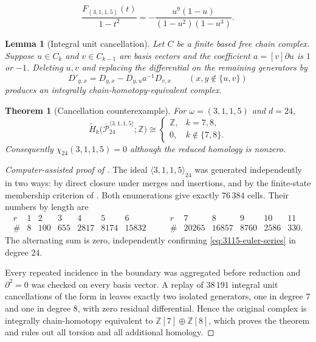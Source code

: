 \documentclass[10pt,a4paper]{amsart}
\newtheorem{theorem}{Theorem}
\newtheorem{lemma}{Lemma}
\newcommand{\Pw}{\overline{\mathcal P}}
\newcommand{\ZZ}{\mathbb Z}
\begin{document}
\begin{equation}\label{eq:3115-euler-series}
 \frac{F_{(3,1,1,5)}(t)}{1-t^2}
 =-\frac{u^9(1-u)}{(1-u^2)(1-u^3)}.
\end{equation}

\begin{lemma}[Integral unit cancellation]\label{lem:unit-cancellation}
Let $C$ be a finite based free chain complex.  Suppose $u\in C_k$ and
$v\in C_{k-1}$ are basis vectors and the coefficient
$a=[v]\partial u$ is $1$ or $-1$.  Deleting $u,v$ and replacing the
differential on the remaining generators by
\[
 D'_{y,x}=D_{y,x}-D_{y,u}a^{-1}D_{v,x}
 \qquad(x,y\notin\{u,v\})
\]
produces an integrally chain-homotopy-equivalent complex.
\end{lemma}

\begin{theorem}[Cancellation counterexample]\label{thm:second-main}
For $\omega=(3,1,1,5)$ and $d=24$,
\[
  \widetilde H_k\bigl(\Pw_{24}^{\langle3,1,1,5\rangle};\ZZ\bigr)
  \cong
  \begin{cases}
    \ZZ,&k=7,8,\\
    0,&k\notin\{7,8\}.
  \end{cases}
\]
Consequently $\chi_{24}(3,1,1,5)=0$ although the reduced homology is nonzero.
\end{theorem}

\begin{proof}[Computer-assisted proof of ]
The ideal $\langle3,1,1,5\rangle_{24}$ was generated independently in two
ways: by direct closure under merges and insertions, and by the finite-state
membership criterion of .  Both enumerations give exactly
$76\,384$ cells.  Their numbers by length are
\[
\begin{array}{c|rrrrrr}
r&1&2&3&4&5&6\\\hline
\#&8&100&655&2817&8174&15832
\end{array}
\qquad
\begin{array}{c|rrrrr}
r&7&8&9&10&11\\\hline
\#&20265&16857&8760&2586&330.
\end{array}
\]
The alternating sum is zero, independently confirming
\eqref{eq:3115-euler-series} in degree $24$.

Every repeated incidence in the boundary was aggregated before reduction and
$\partial^2=0$ was checked on every basis vector.  A replay of $38\,191$
integral unit cancellations of the form in
 leaves exactly two isolated generators, one in
degree $7$ and one in degree $8$, with zero residual differential.  Hence the
original complex is integrally chain-homotopy equivalent to
$\ZZ[7]\oplus\ZZ[8]$, which proves the theorem and rules out all torsion and
all additional homology.
\end{proof}
\end{document}
